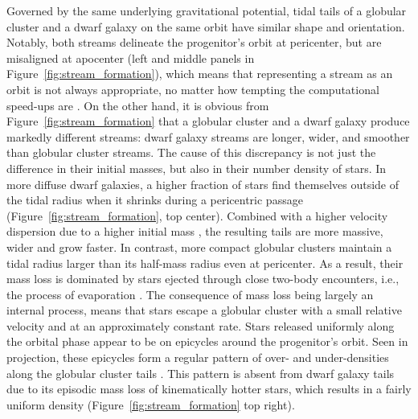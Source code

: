 \documentclass[final,5p,times,twocolumn,authoryear]{elsarticle}
\begin{document}
Governed by the same underlying gravitational potential, tidal tails of a globular cluster and a dwarf galaxy on the same orbit have similar shape and orientation.
Notably, both streams delineate the progenitor's orbit at pericenter, but are misaligned at apocenter (left and middle panels in Figure~\ref{fig:stream_formation}), which means that representing a stream as an orbit is not always appropriate, no matter how tempting the computational speed-ups are \citep{eyre, sanders}.
On the other hand, it is obvious from Figure~\ref{fig:stream_formation} that a globular cluster and a dwarf galaxy produce markedly different streams: dwarf galaxy streams are longer, wider, and smoother than globular cluster streams.
The cause of this discrepancy is not just the difference in their initial masses, but also in their number density of stars.
In more diffuse dwarf galaxies, a higher fraction of stars find themselves outside of the tidal radius when it shrinks during a pericentric passage (Figure~\ref{fig:stream_formation}, top center).
Combined with a higher velocity dispersion due to a higher initial mass \citep{}, the resulting tails are more massive, wider and grow faster.
In contrast, more compact globular clusters maintain a tidal radius larger than its half-mass radius even at pericenter.
As a result, their mass loss is dominated by stars ejected through close two-body encounters, i.e., the process of evaporation \citep{baumgardt:2003}.
The consequence of mass loss being largely an internal process, means that stars escape a globular cluster with a small relative velocity and at an approximately constant rate.
Stars released uniformly along the orbital phase appear to be on epicycles around the progenitor's orbit.
Seen in projection, these epicycles form a regular pattern of over- and under-densities along the globular cluster tails \citep[Figure~\ref{}, bottom right;][]{kuepper:2008, kuepper:2010, just:2009}.
This pattern is absent from dwarf galaxy tails due to its episodic mass loss of kinematically hotter stars, which results in a fairly uniform density (Figure~\ref{fig:stream_formation} top right).
\end{document}
